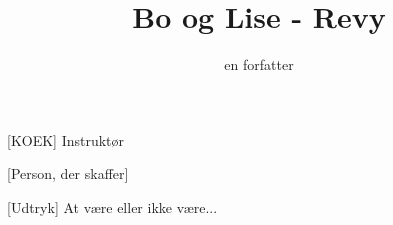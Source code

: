 \documentclass[a4paper,11pt]{article}
\title{Bo og Lise - Revy}
\author{en forfatter}
\begin{document}
\maketitle

\begin{roles}
[KOEK] Instruktør
\end{roles}

\begin{props}
[Person, der skaffer]
\end{props}


\begin{sketch}


[Udtryk] At være eller ikke være... 



\end{sketch}
\end{document}
